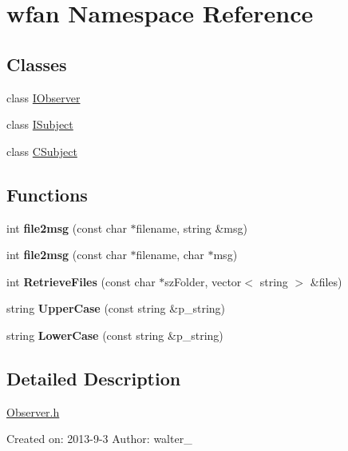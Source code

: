 \hypertarget{namespacewfan}{\section{wfan Namespace Reference}
\label{namespacewfan}
}
\subsection*{Classes}
\begin{DoxyCompactItemize}
\item 
class \hyperlink{classwfan_1_1IObserver}{I\-Observer}
\item 
class \hyperlink{classwfan_1_1ISubject}{I\-Subject}
\item 
class \hyperlink{classwfan_1_1CSubject}{C\-Subject}
\end{DoxyCompactItemize}
\subsection*{Functions}
\begin{DoxyCompactItemize}
\item 
\hypertarget{namespacewfan_ae6664e61135125fdfc6f79768c0a7af6}{int {\bfseries file2msg} (const char $\ast$filename, string \&msg)}\label{namespacewfan_ae6664e61135125fdfc6f79768c0a7af6}

\item 
\hypertarget{namespacewfan_ac5f3979860360695a796287e1fd6f6ea}{int {\bfseries file2msg} (const char $\ast$filename, char $\ast$msg)}\label{namespacewfan_ac5f3979860360695a796287e1fd6f6ea}

\item 
\hypertarget{namespacewfan_aec25391f9b16818822fdbd0986f99505}{int {\bfseries Retrieve\-Files} (const char $\ast$sz\-Folder, vector$<$ string $>$ \&files)}\label{namespacewfan_aec25391f9b16818822fdbd0986f99505}

\item 
\hypertarget{namespacewfan_aa295aeeec5236e89d37c5f1ad2ccb617}{string {\bfseries Upper\-Case} (const string \&p\-\_\-string)}\label{namespacewfan_aa295aeeec5236e89d37c5f1ad2ccb617}

\item 
\hypertarget{namespacewfan_a2fbe984287c500c66c1b2cc54b6352e1}{string {\bfseries Lower\-Case} (const string \&p\-\_\-string)}\label{namespacewfan_a2fbe984287c500c66c1b2cc54b6352e1}

\end{DoxyCompactItemize}


\subsection{Detailed Description}
\hyperlink{Observer_8h_source}{Observer.\-h}

Created on\-: 2013-\/9-\/3 Author\-: walter\-\_ 
